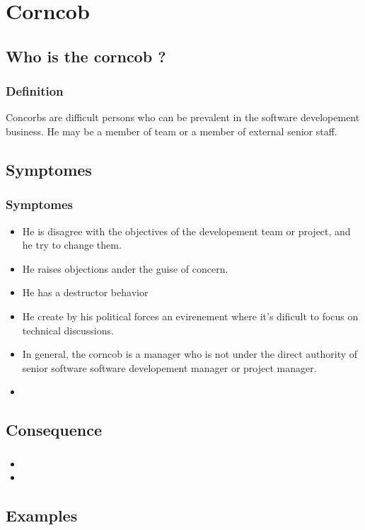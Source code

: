 \documentclass{beamer}
\begin{document}
\section{Corncob}
\subsection{Who is the corncob ?}
\begin{frame}
\frametitle{Definition}
Concorbs are difficult persons who can be prevalent in the software developement business. He may be a member of team or a member of external senior staff.


\end{frame}

\subsection{Symptomes}
\begin{frame}
\frametitle{Symptomes}
\begin{itemize}
\item He is disagree with the objectives of the developement team or project, and he try to change them.
\item He raises objections ander the guise of concern.
\item He has a destructor behavior
\item He create by his political forces an evirenement where it's dificult to focus on technical discussions.
\item In general, the corncob is a manager who is not under the direct authority of senior software software developement manager or project manager.
\item 
\end{itemize}
\end{frame}

\subsection{Consequence}
\begin{frame}
\frametitle{}
\begin{itemize}
\item 
\item 
\end{itemize}

\end{frame}

\subsection{Examples}
\begin{frame}
\frametitle{}
\end{frame}
\end{document}

